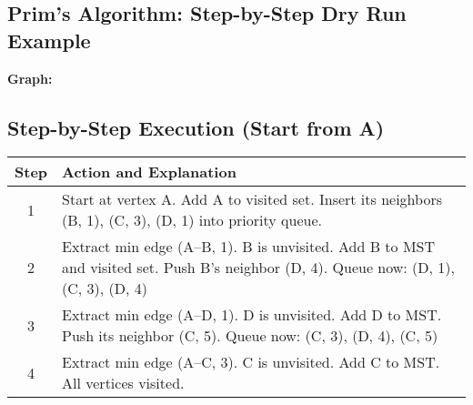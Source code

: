 \documentclass[a4paper,14pt]{extarticle}
\begin{document}
\newpage
\subsection{Prim's Algorithm: Step-by-Step Dry Run Example}

\textbf{Graph:}


\begin{tcolorbox}[title=Directed Weighted Graph]

\end{tcolorbox}


\subsection*{Step-by-Step Execution (Start from A)}

\begin{longtable}{|c|p{8cm}|}
\hline
\textbf{Step} & \textbf{Action and Explanation} \\
\hline
1 & Start at vertex A. Add A to visited set. Insert its neighbors (B, 1), (C, 3), (D, 1) into priority queue. \\
\hline
2 & Extract min edge (A–B, 1). B is unvisited. Add B to MST and visited set. Push B’s neighbor (D, 4). Queue now: (D, 1), (C, 3), (D, 4) \\
\hline
3 & Extract min edge (A–D, 1). D is unvisited. Add D to MST. Push its neighbor (C, 5). Queue now: (C, 3), (D, 4), (C, 5) \\
\hline
4 & Extract min edge (A–C, 3). C is unvisited. Add C to MST. All vertices visited. \\
\hline
\end{longtable}
\end{document}
